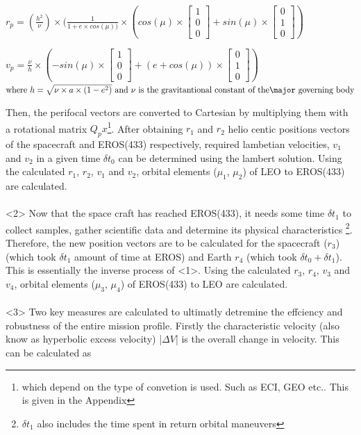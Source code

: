 \documentclass[11pt,a4paper]{article}
\begin{document}
\begin{multicols}{2}
$r_p = (\frac{h^2}{\nu}) \times (\frac{1}{1 + e\times cos(\mu))} \times (cos(\mu)\times\begin{bmatrix}1\\0\\0 \end{bmatrix} + sin(\mu)\times\begin{bmatrix}0\\1\\0 \end{bmatrix})$

$v_p = \frac{\nu}{h}\times(-sin(\mu)\times\begin{bmatrix}1\\0\\0 \end{bmatrix} + (e + cos(\mu))\times\begin{bmatrix}0\\1\\0 \end{bmatrix})$
$\text{where } h=\sqrt{\nu\times a\times(1-e^2)} \text{ and } \\ \nu \text{ is the gravitantional constant of the \\\major governing body}$

Then, the perifocal vectors are converted to Cartesian by multiplying them with a rotational matrix $Q_px$\footnote{which depend on the type of convetion is used. Such as ECI, GEO etc.. This is given in the Appendix}. After obtaining $r_1$ and $r_2$ helio centic positions vectors of the spacecraft and EROS(433) respectively, required lambetian velocities, $v_1$ and $v_2$ in a given time $\delta t_0$ can be determined using the lambert solution. Using the calculated $r_1$, $r_2$, $v_1$ and $v_2$, orbital elements ($\mu_1$, $\mu_2$) of LEO to EROS(433) are calculated. 
\\
\\
{\LARGE{{<2>}}} Now that the space craft has reached EROS(433), it needs some time $\delta t_1$ to collect samples, gather scientific data and determine its physical characteristics \footnote{$\delta t_1$ also includes the time spent in return orbital maneuvers}. Therefore, the new position vectors are to be calculated for the spacecraft ($r_3$) (which took $\delta t_1$ amount of time at EROS) and Earth $r_4$ (which took $\delta t_0+\delta t_1$). This is essentially the inverse process of {\LARGE{{<1>}}}. Using the calculated $r_3$, $r_4$, $v_3$ and $v_4$, orbital elements ($\mu_3$, $\mu_4$) of EROS(433) to LEO are calculated. 
\\
\\
{\LARGE{{<3>}}} Two key measures are calculated to ultimatly detremine the effciency and robustness of the entire mission profile. Firstly the characteristic velocity (also know as hyperbolic excess velocity) |$\Delta V$| is the overall change in velocity. This can be calculated as


\end{multicols}
\end{document}
